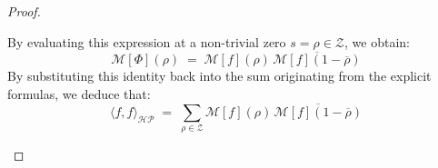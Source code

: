 \documentclass[Riemann_Hypothesis.tex]{subfiles}
\begin{document}
\begin{proof}
\begin{part_proof}
\begin{equation*}
        \end{equation*}
        By evaluating this expression at a non-trivial zero $s = \rho \in \mathcal{Z}$, we obtain:
        \begin{equation*}
            \mathcal{M}[\Phi](\rho) \;=\; \mathcal{M}[f](\rho) \, \overline{\mathcal{M}[f](1 - \overline{\rho})}
        \end{equation*}
        By substituting this identity back into the sum originating from the explicit formulas, we deduce that:
        \begin{equation*}
            \langle f, f \rangle_{\mathcal{HP}} \;=\; \sum_{\rho \in \mathcal{Z}} \mathcal{M}[f](\rho) \, \overline{\mathcal{M}[f](1 - \overline{\rho})}
        \end{equation*}
    \end{part_proof}


\end{proof}
\end{document}
